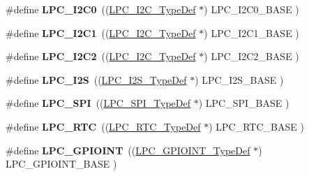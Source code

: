 \begin{DoxyCompactItemize}
\item 
\hypertarget{group___l_p_c17xx___system_ga14b6c56857e970a682a9bb22a0cb6716}{\#define {\bfseries \-L\-P\-C\-\_\-\-I2\-C0}~((\hyperlink{struct_l_p_c___i2_c___type_def}{\-L\-P\-C\-\_\-\-I2\-C\-\_\-\-Type\-Def}       $\ast$) \-L\-P\-C\-\_\-\-I2\-C0\-\_\-\-B\-A\-S\-E     )}\label{group___l_p_c17xx___system_ga14b6c56857e970a682a9bb22a0cb6716}

\item 
\hypertarget{group___l_p_c17xx___system_gad6d6333e47875813be171cffef258837}{\#define {\bfseries \-L\-P\-C\-\_\-\-I2\-C1}~((\hyperlink{struct_l_p_c___i2_c___type_def}{\-L\-P\-C\-\_\-\-I2\-C\-\_\-\-Type\-Def}       $\ast$) \-L\-P\-C\-\_\-\-I2\-C1\-\_\-\-B\-A\-S\-E     )}\label{group___l_p_c17xx___system_gad6d6333e47875813be171cffef258837}

\item 
\hypertarget{group___l_p_c17xx___system_ga6bcdaa0ab66f4e3d213a488b34055557}{\#define {\bfseries \-L\-P\-C\-\_\-\-I2\-C2}~((\hyperlink{struct_l_p_c___i2_c___type_def}{\-L\-P\-C\-\_\-\-I2\-C\-\_\-\-Type\-Def}       $\ast$) \-L\-P\-C\-\_\-\-I2\-C2\-\_\-\-B\-A\-S\-E     )}\label{group___l_p_c17xx___system_ga6bcdaa0ab66f4e3d213a488b34055557}

\item 
\hypertarget{group___l_p_c17xx___system_ga1d2800cab1a50bdf99efe66d6028b663}{\#define {\bfseries \-L\-P\-C\-\_\-\-I2\-S}~((\hyperlink{struct_l_p_c___i2_s___type_def}{\-L\-P\-C\-\_\-\-I2\-S\-\_\-\-Type\-Def}       $\ast$) \-L\-P\-C\-\_\-\-I2\-S\-\_\-\-B\-A\-S\-E      )}\label{group___l_p_c17xx___system_ga1d2800cab1a50bdf99efe66d6028b663}

\item 
\hypertarget{group___l_p_c17xx___system_ga9b593f008d0061052e90a8865d702ce5}{\#define {\bfseries \-L\-P\-C\-\_\-\-S\-P\-I}~((\hyperlink{struct_l_p_c___s_p_i___type_def}{\-L\-P\-C\-\_\-\-S\-P\-I\-\_\-\-Type\-Def}       $\ast$) \-L\-P\-C\-\_\-\-S\-P\-I\-\_\-\-B\-A\-S\-E      )}\label{group___l_p_c17xx___system_ga9b593f008d0061052e90a8865d702ce5}

\item 
\hypertarget{group___l_p_c17xx___system_ga8303d3e5135b2a039f0dc5f93c194f78}{\#define {\bfseries \-L\-P\-C\-\_\-\-R\-T\-C}~((\hyperlink{struct_l_p_c___r_t_c___type_def}{\-L\-P\-C\-\_\-\-R\-T\-C\-\_\-\-Type\-Def}       $\ast$) \-L\-P\-C\-\_\-\-R\-T\-C\-\_\-\-B\-A\-S\-E      )}\label{group___l_p_c17xx___system_ga8303d3e5135b2a039f0dc5f93c194f78}

\item 
\hypertarget{group___l_p_c17xx___system_gaefe2f52407c1ce58395766dc760525b5}{\#define {\bfseries \-L\-P\-C\-\_\-\-G\-P\-I\-O\-I\-N\-T}~((\hyperlink{struct_l_p_c___g_p_i_o_i_n_t___type_def}{\-L\-P\-C\-\_\-\-G\-P\-I\-O\-I\-N\-T\-\_\-\-Type\-Def}   $\ast$) \-L\-P\-C\-\_\-\-G\-P\-I\-O\-I\-N\-T\-\_\-\-B\-A\-S\-E  )}\label{group___l_p_c17xx___system_gaefe2f52407c1ce58395766dc760525b5}


\end{DoxyCompactItemize}

